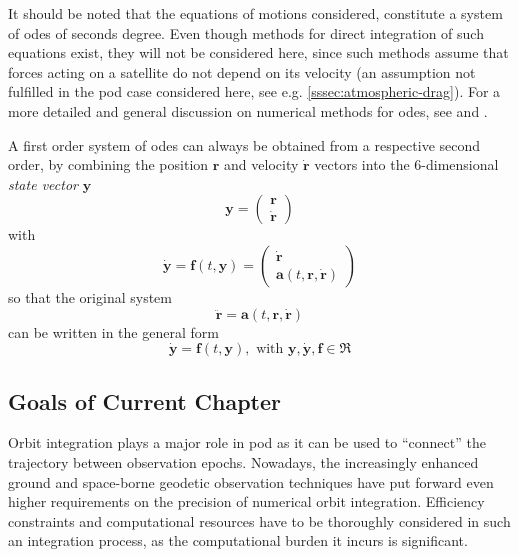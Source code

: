 It should be noted that the equations of motions considered, constitute a system 
of \glspl{ode} of seconds degree. Even though methods for direct integration of 
such equations exist, they will not be considered here, since such methods assume 
that forces acting on a satellite do not depend on its velocity (an assumption not 
fulfilled in the \gls{pod} case considered here, see e.g. \autoref{sssec:atmospheric-drag}).
For a more detailed and general discussion on numerical methods for \glspl{ode}, 
see \cite{Hairer2009I} and \cite{Hairer2010II}.

A first order system of \glspl{ode} can always be obtained from a respective second 
order, by combining the position $\bm{r}$ and velocity $\bm{\dot{r}}$ vectors into 
the 6-dimensional \emph{state vector} $\bm{y}$
\begin{equation}
    \bm{y} = \begin{pmatrix}\bm{r}\\ \bm{\dot{r}} \end{pmatrix}
\end{equation}
with 
\begin{equation}
    \bm{\dot{y}} = \bm{f}(t,\bm{y}) = 
      \begin{pmatrix}\bm{\dot{r}} \\ 
      \bm{a}(t, \bm{r}, \bm{\dot{r}}) \end{pmatrix}
\end{equation}
so that the original system
\begin{equation}
    \bm{\ddot{r}} = \bm{a}(t, \bm{r}, \bm{\dot{r}})
\end{equation}
can be written in the general form
\begin{equation}\label{eq:genode0}
    \bm{\dot{y}} = \bm{f}(t,\bm{y}), \text{ with } \bm{y}, \bm{\dot{y}}, \bm{f} \in \Re
\end{equation}

\subsection{Goals of Current Chapter}\label{ssec:goals-of-integrator}
Orbit integration plays a major role in \gls{pod} as it can be used to ``connect'' 
the trajectory between observation epochs. Nowadays, the increasingly enhanced 
ground and space-borne geodetic observation techniques have put forward even higher 
requirements on the precision of numerical orbit integration. Efficiency 
constraints and computational resources have to be thoroughly considered in such 
an integration process, as the computational burden it incurs is significant.


